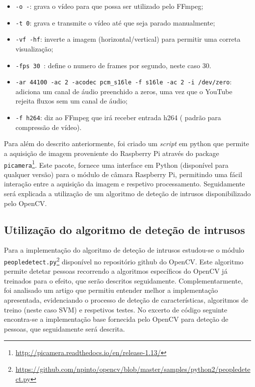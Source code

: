 \begin{itemize}
	\item \texttt{-o -}: grava o vídeo para que possa ser utilizado pelo FFmpeg; 
	
	\item \texttt{-t 0}: grava e transmite o vídeo até que seja parado manualmente; 
	
	\item \texttt{-vf -hf}: inverte a imagem (horizontal/vertical) para permitir uma correta visualização; 
	
	\item \texttt{-fps 30 }: define o numero de frames por segundo, neste caso 30. 
	
	\item \texttt{-ar 44100 -ac 2 -acodec pcm\_s16le -f s16le -ac 2 -i /dev/zero}: adiciona um canal de áudio preenchido a zeros, uma vez que o YouTube rejeita fluxos sem um canal de áudio; 
	
	\item \texttt{-f h264}: diz ao FFmpeg que irá receber entrada h264 ( padrão para compressão de vídeo). 
	
\end{itemize}






Para além do descrito anteriormente, foi criado um \textit{script} em python que permite a aquisição de imagem proveniente do Raspberry Pi através do package \texttt{picamera}\footnote{\url{http://picamera.readthedocs.io/en/release-1.13/}}. Este pacote, fornece  uma interface em Python (disponível para qualquer versão) para o módulo de câmara Raspberry Pi, permitindo uma fácil interação entre a aquisição da imagem e respetivo processamento.
Seguidamente será explicada a utilização de um algoritmo de deteção de intrusos disponibilizado pelo OpenCV. 


 


\subsection{Utilização do algoritmo de deteção de intrusos}
\label{algdetecao}


Para a implementação do algoritmo de deteção de intrusos estudou-se o módulo \linebreak \texttt{peopledetect.py}\footnote{\url{https://github.com/npinto/opencv/blob/master/samples/python2/peopledetect.py}} disponível no repositório github do OpenCV. Este algoritmo permite detetar pessoas recorrendo a algoritmos específicos do OpenCV já treinados para o efeito, que serão descritos seguidamente. Complementarmente, foi analisado um artigo\cite{Dalal} que permitiu entender melhor a implementação apresentada, evidenciando o processo de deteção de características, algoritmos de treino (neste caso \ac{SVM}) e respetivos testes. No excerto de código seguinte encontra-se a implementação base fornecida pelo OpenCV para deteção de pessoas, que seguidamente será descrita. 

